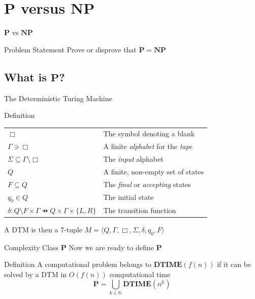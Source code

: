 \documentclass[handout]{beamer}
\newcommand{\Natural}{\mathbb{N}}
\newcommand{\PTIME}{\mathbf{P}}
\newcommand{\NPTIME}{\mathbf{NP}}
\newcommand{\DTIME}{\mathbf{DTIME}}
\begin{document}
  \section{$\PTIME$ versus $\NPTIME$}
  \begin{frame}{$\PTIME$ vs $\NPTIME$}
      \begin{block}{Problem Statement}
          Prove or disprove that $\PTIME = \NPTIME$
      \end{block}
  \end{frame}
  \subsection{What is $\PTIME$?}
  \begin{frame}{The Deterministic Turing Machine}
      \begin{block}{Definition}
          \pause
          \begin{table}[]
              \centering
              \begin{tabular}{ll}
                  $\Box$ & The symbol denoting a blank \pause \\
                  $\Gamma \ni \Box$
                  & A finite \textit{alphabet} for the \textit{tape} \pause \\
                  $\Sigma \subseteq \Gamma \setminus \Box$ 
                  & The \textit{input} alphabet \pause \\
                  $Q$ & A finite, non-empty set of states \pause \\
                  $F \subseteq Q$
                  & The \textit{final} or \textit{accepting} states \pause \\
                  $q_0 \in Q$ & The initial state \pause \\
                  $\delta: Q \setminus F \times \Gamma \pfun Q
                  \times \Gamma \times \{L, R\}$ & The transition function
              \end{tabular}
          \end{table}
          \pause
          A DTM is then a 7-tuple
          $M = \langle Q, \Gamma, \Box, \Sigma, \delta, q_0, F \rangle$
      \end{block}
  \end{frame}
  \begin{frame}{Complexity Class $\PTIME$}
      Now we are ready to define $\PTIME$
      \pause
      \begin{block}{Definition}
          A computational problem belongs to
              $\DTIME\left(f(n)\right)$ if it can be solved by a
              DTM in $O(f(n))$ computational time 
              \pause
          $$\PTIME = \bigcup_{k \in \Natural}
              \DTIME\left(n^k\right)$$
      \end{block}
  \end{frame}
\end{document}

